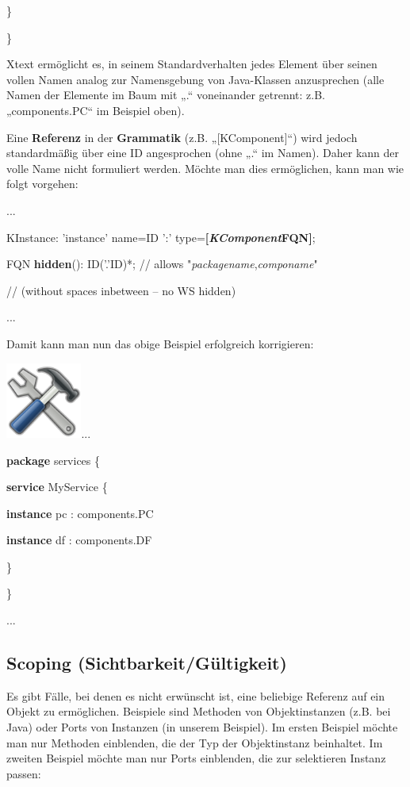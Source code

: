 \documentclass[]{article}
\begin{document}
\}

\}

Xtext ermöglicht es, in seinem Standardverhalten jedes Element über
seinen vollen Namen analog zur Namensgebung von Java-Klassen
anzusprechen (alle Namen der Elemente im Baum mit „.`` voneinander
getrennt: z.B. „components.PC`` im Beispiel oben).

Eine \textbf{Referenz} in der \textbf{Grammatik }(z.B.
„{[}KComponent{]}``) wird jedoch standardmäßig über eine ID angesprochen
(ohne „.`` im Namen). Daher kann der volle Name nicht formuliert werden.
Möchte man dies ermöglichen, kann man wie folgt vorgehen:

...

KInstance: 'instance' name=ID ':'
type=\textbf{{[}}\emph{\textbf{KComponent}}\textbf{\textbar{}FQN{]}};

FQN \textbf{hidden}(): ID('.'ID)*; // allows
"\emph{packagename},\emph{componame}"

// (without spaces inbetween -- no WS hidden)

...

Damit kann man nun das obige Beispiel erfolgreich korrigieren:

\includegraphics[width=0.98350in,height=0.98350in]{./Pictures/1000020100000080000000807EA91CDFA7B7F397.png}...

\textbf{package} services \{

\textbf{service} MyService \{

\textbf{instance} pc : components.PC

\textbf{instance} df : components.DF

\}

\}

...

\subsection[Scoping
(Sichtbarkeit/Gültigkeit)]{\texorpdfstring{\protect\hypertarget{anchor-45}{}{}\protect\hypertarget{anchor-46}{}{}Scoping
(Sichtbarkeit/Gültigkeit)}{Scoping (Sichtbarkeit/Gültigkeit)}}\label{scoping-sichtbarkeitguxfcltigkeit}

Es gibt Fälle, bei denen es nicht erwünscht ist, eine beliebige Referenz
auf ein Objekt zu ermöglichen. Beispiele sind Methoden von
Objektinstanzen (z.B. bei Java) oder Ports von Instanzen (in unserem
Beispiel). Im ersten Beispiel möchte man nur Methoden einblenden, die
der Typ der Objektinstanz beinhaltet. Im zweiten Beispiel möchte man nur
Ports einblenden, die zur selektieren Instanz passen:
\end{document}
